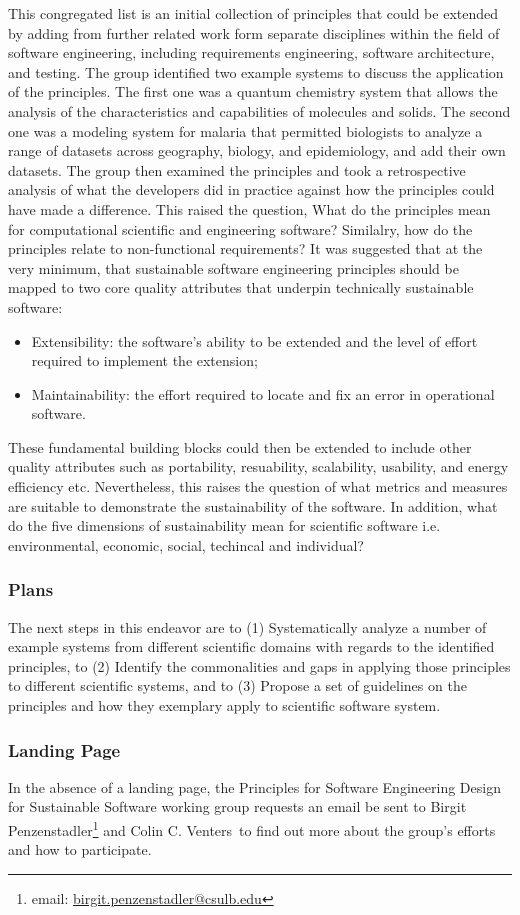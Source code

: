 This congregated list is an initial collection of principles that could be extended by adding from further related work form separate disciplines within the field of software engineering, including requirements engineering, software architecture, and testing. The group identified two example systems to discuss the application of the principles. The first one was a quantum chemistry system that allows the analysis of the characteristics and capabilities of molecules and solids. The second one was a modeling system for malaria that permitted biologists to analyze a range of datasets across geography, biology, and epidemiology, and add their own datasets. The group then examined the principles and took a retrospective analysis of what the developers did in practice against how the principles could have made a difference. This raised the question, What do the principles mean for  computational scientific and engineering software? Similalry, how do the principles relate to non-functional requirements? It was suggested that at the very minimum, that sustainable software engineering principles should be mapped to two core quality attributes that underpin technically sustainable software:
\begin{itemize}
\item Extensibility: the software’s ability to be extended and the level of effort required to implement the extension;
\item Maintainability: the effort required to locate and fix an error in operational software.
\end{itemize}
These fundamental building blocks could then be extended to include other quality attributes such as portability, resuability, scalability, usability, and energy efficiency etc. Nevertheless, this raises the question of what metrics and measures are suitable to demonstrate the sustainability of the software. In addition, what do the five dimensions of sustainability mean for scientific software i.e. environmental, economic, social, techincal and individual?

\subsubsection{Plans}
The next steps in this endeavor are to (1) Systematically analyze a number of example systems from different scientific domains with regards to the identified principles, to (2) Identify the commonalities and gaps in applying those principles to different scientific systems, and to (3) Propose a set of guidelines on the principles and how they exemplary apply to scientific software system. 

\subsubsection{Landing Page}
In the absence of a landing page, the Principles for Software Engineering Design for Sustainable Software working group requests an email be sent to Birgit Penzenstadler\footnote{email: \href{mailto:birgit.penzenstadler@csulb.edu}{birgit.penzenstadler@csulb.edu}} and Colin C. Venters\ to find out more about the group's efforts and how to participate.
